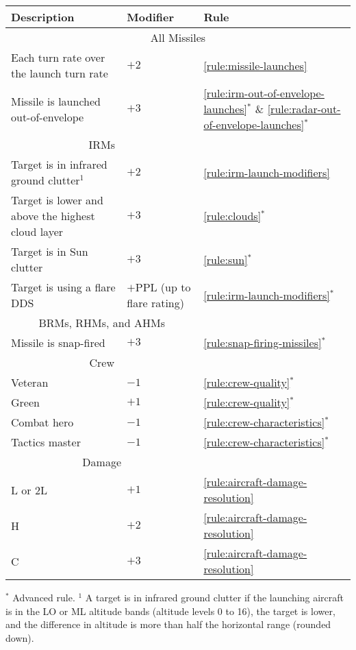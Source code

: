 {\begin{twocolumntable}
\begin{tabularx}{0.9\linewidth}{Xll}
\toprule
Description&Modifier&Rule\\
\midrule
\multicolumn{3}{c}{All Missiles}\\
\midrule
Each turn rate over the launch turn rate&$+2$&\ref{rule:missile-launches}\\
Missile is launched out-of-envelope&$+3$&\ref{rule:irm-out-of-envelope-launches}$^*$ \& \ref{rule:radar-out-of-envelope-launches}$^*$\\
\midrule
\multicolumn{2}{c}{IRMs}\\
\midrule
Target is in infrared ground clutter$^1$&$+2$&\ref{rule:irm-launch-modifiers}\\
Target is lower and above the highest cloud layer&$+3$&\ref{rule:clouds}$^*$
\\
Target is in Sun clutter&$+3$&\ref{rule:sun}$^*$\\
Target is using a flare DDS&$+$PPL (up to flare rating)&\ref{rule:irm-launch-modifiers}$^*$\\
\midrule
\multicolumn{2}{c}{BRMs, RHMs, and AHMs}\\
\midrule
Missile is snap-fired&$+3$&\ref{rule:snap-firing-missiles}$^*$\\
\midrule
\multicolumn{2}{c}{Crew}\\
\midrule
Veteran&$-1$&\ref{rule:crew-quality}$^*$\\
Green&$+1$&\ref{rule:crew-quality}$^*$\\
Combat hero&$-1$&\ref{rule:crew-characteristics}$^*$\\
Tactics master&$-1$&\ref{rule:crew-characteristics}$^*$\\
\midrule
\multicolumn{2}{c}{Damage}\\
\midrule
L or 2L&$+1$&\ref{rule:aircraft-damage-resolution}\\
H&$+2$&\ref{rule:aircraft-damage-resolution}\\
C&$+3$&\ref{rule:aircraft-damage-resolution}\\
\bottomrule
\end{tabularx}
\begin{tablenote}{0.9\linewidth}
$^*$ Advanced rule. $^1$ A target is in infrared ground clutter if the launching aircraft is in the LO or ML altitude bands (altitude levels 0 to 16), the target is lower, and the difference in altitude is more than half the horizontal range (rounded down).
\end{tablenote}
\end{twocolumntable}
}

